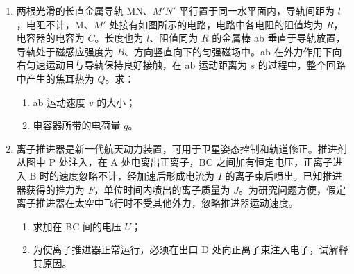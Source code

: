 \documentclass[\gkver]{gaokaozhenti}
\begin{document}
\begin{enumerate}
\item
两根光滑的长直金属导轨 MN、$M'N'$ 平行置于同一水平面内，导轨间距为 $l$，电阻不计，M、$M'$ 处接有如图所示的电路，电路中各电阻的阻值均为 $R$，电容器的电容为 $C$。长度也为 $l$、阻值同为 $R$ 的金属棒 ab 垂直于导轨放置，导轨处于磁感应强度为 $B$、方向竖直向下的匀强磁场中。ab 在外力作用下向右匀速运动且与导轨保持良好接触，在 ab 运动距离为 $s$ 的过程中，整个回路中产生的焦耳热为 $Q$。求：
\begin{enumerate}
	\item
	ab 运动速度 $v$ 的大小；
	\item
	电容器所带的电荷量 $q$。
\end{enumerate}



\item
离子推进器是新一代航天动力装置，可用于卫星姿态控制和轨道修正。推进剂从图中 P 处注入，在 A 处电离出正离子，BC 之间加有恒定电压，正离子进入 B 时的速度忽略不计，经加速后形成电流为 $I$ 的离子束后喷出。已知推进器获得的推力为 $F$，单位时间内喷出的离子质量为 $J$。为研究问题方便，假定离子推进器在太空中飞行时不受其他外力，忽略推进器运动速度。
\begin{enumerate}
	\item
	求加在 BC 间的电压 $U$；
	\item
	为使离子推进器正常运行，必须在出口 D 处向正离子束注入电子，试解释其原因。
\end{enumerate}


\end{enumerate}
\end{document}
